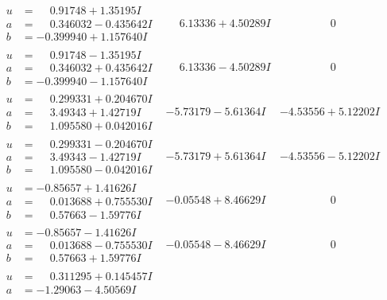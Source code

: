 \documentclass[1p]{elsarticle_modified}
\theoremstyle{definition}
\begin{document}
$$\begin{array}{c|c|c}
 \hline 
\begin{aligned}
u &= \phantom{-}0.91748 + 1.35195 I \\
a &= \phantom{-}0.346032 - 0.435642 I \\
b &= -0.399940 + 1.157640 I\end{aligned}
 & \phantom{-}6.13336 + 4.50289 I & \phantom{-0.000000 } 0 \\ \hline\begin{aligned}
u &= \phantom{-}0.91748 - 1.35195 I \\
a &= \phantom{-}0.346032 + 0.435642 I \\
b &= -0.399940 - 1.157640 I\end{aligned}
 & \phantom{-}6.13336 - 4.50289 I & \phantom{-0.000000 } 0 \\ \hline\begin{aligned}
u &= \phantom{-}0.299331 + 0.204670 I \\
a &= \phantom{-}3.49343 + 1.42719 I \\
b &= \phantom{-}1.095580 + 0.042016 I\end{aligned}
 & -5.73179 - 5.61364 I & -4.53556 + 5.12202 I \\ \hline\begin{aligned}
u &= \phantom{-}0.299331 - 0.204670 I \\
a &= \phantom{-}3.49343 - 1.42719 I \\
b &= \phantom{-}1.095580 - 0.042016 I\end{aligned}
 & -5.73179 + 5.61364 I & -4.53556 - 5.12202 I \\ \hline\begin{aligned}
u &= -0.85657 + 1.41626 I \\
a &= \phantom{-}0.013688 + 0.755530 I \\
b &= \phantom{-}0.57663 - 1.59776 I\end{aligned}
 & -0.05548 + 8.46629 I & \phantom{-0.000000 } 0 \\ \hline\begin{aligned}
u &= -0.85657 - 1.41626 I \\
a &= \phantom{-}0.013688 - 0.755530 I \\
b &= \phantom{-}0.57663 + 1.59776 I\end{aligned}
 & -0.05548 - 8.46629 I & \phantom{-0.000000 } 0 \\ \hline\begin{aligned}
u &= \phantom{-}0.311295 + 0.145457 I \\
a &= -1.29063 - 4.50569 I \\

\end{aligned}
\end{array}$$
\end{document}
